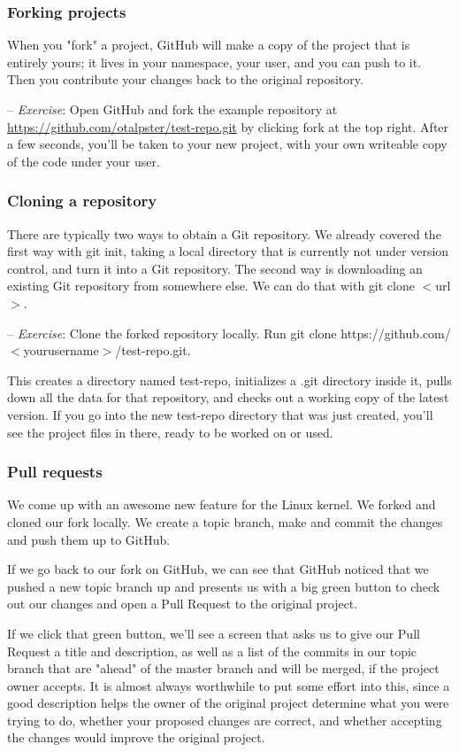 \documentclass[12pt,a4]{article}
\newcommand{\ilcode}[1]{\textcolor[RGB]{160, 110, 220}{#1}}
\begin{document}
\subsubsection{Forking projects}
When you "fork" a project, GitHub will make a copy of the project that is
entirely yours; it lives in your namespace, your user, and you can push to it.
Then you contribute your changes back to the original repository.

{\sf -- \emph{Exercise}:} Open GitHub and fork the example repository at
\url{https://github.com/otalpster/test-repo.git} by clicking fork at the top
right. After a few seconds, you’ll be taken to your new project, with your own
writeable copy of the code under your user.

\subsubsection{Cloning a repository}
There are typically two ways to obtain a Git repository. We already covered the
first way with \ilcode{git init}, taking a local directory that is currently not
under version control, and turn it into a Git repository. The second way is
downloading an existing Git repository from somewhere else. We can do that with
\ilcode{git clone $<$url$>$}.

{\sf -- \emph{Exercise}:} Clone the forked repository locally. Run \ilcode{git
clone https://github.com/$<$yourusername$>$/test-repo.git}.

This creates a directory named test-repo, initializes a \ilcode{.git} directory
inside it, pulls down all the data for that repository, and checks out a working
copy of the latest version. If you go into the new test-repo directory that was
just created, you’ll see the project files in there, ready to be worked on or
used.

\subsubsection{Pull requests}
We come up with an awesome new feature for the Linux kernel. We forked and
cloned our fork locally. We create a topic branch, make and commit the changes
and push them up to GitHub.

If we go back to our fork on GitHub, we can see that GitHub noticed that we
pushed a new topic branch up and presents us with a big green button to check
out our changes and open a Pull Request to the original project.

If we click that green button, we’ll see a screen that asks us to give our Pull
Request a title and description, as well as a list of the commits in our topic
branch that are "ahead" of the master branch and will be merged, if the project
owner accepts. It is almost always worthwhile to put some effort into this,
since a good description helps the owner of the original project determine what
you were trying to do, whether your proposed changes are correct, and whether
accepting the changes would improve the original project.
\end{document}
